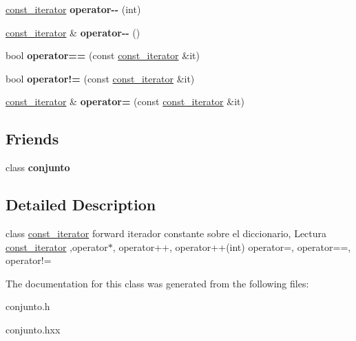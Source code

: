\begin{DoxyCompactItemize}
\item 
\hypertarget{classconjunto_1_1const__iterator_abd83ce93fe699b9f7b35be65fa9eefe6}{\hyperlink{classconjunto_1_1const__iterator}{const\-\_\-iterator} {\bfseries operator-\/-\/} (int)}\label{classconjunto_1_1const__iterator_abd83ce93fe699b9f7b35be65fa9eefe6}

\item 
\hypertarget{classconjunto_1_1const__iterator_adeba9683361264a00f4e0b8e42082d1d}{\hyperlink{classconjunto_1_1const__iterator}{const\-\_\-iterator} \& {\bfseries operator-\/-\/} ()}\label{classconjunto_1_1const__iterator_adeba9683361264a00f4e0b8e42082d1d}

\item 
\hypertarget{classconjunto_1_1const__iterator_a6d2a0501cd5eeea3db0bf9a6a553aa5f}{bool {\bfseries operator==} (const \hyperlink{classconjunto_1_1const__iterator}{const\-\_\-iterator} \&it)}\label{classconjunto_1_1const__iterator_a6d2a0501cd5eeea3db0bf9a6a553aa5f}

\item 
\hypertarget{classconjunto_1_1const__iterator_aea197d9ca07e8451eb857ae84d3796ff}{bool {\bfseries operator!=} (const \hyperlink{classconjunto_1_1const__iterator}{const\-\_\-iterator} \&it)}\label{classconjunto_1_1const__iterator_aea197d9ca07e8451eb857ae84d3796ff}

\item 
\hypertarget{classconjunto_1_1const__iterator_a035da014bfd46ca06eef82f5a8f26686}{\hyperlink{classconjunto_1_1const__iterator}{const\-\_\-iterator} \& {\bfseries operator=} (const \hyperlink{classconjunto_1_1const__iterator}{const\-\_\-iterator} \&it)}\label{classconjunto_1_1const__iterator_a035da014bfd46ca06eef82f5a8f26686}

\end{DoxyCompactItemize}
\subsection*{Friends}
\begin{DoxyCompactItemize}
\item 
\hypertarget{classconjunto_1_1const__iterator_a42fdcda39c77eabd7380e29fcdbe5dd2}{class {\bfseries conjunto}}\label{classconjunto_1_1const__iterator_a42fdcda39c77eabd7380e29fcdbe5dd2}

\end{DoxyCompactItemize}


\subsection{Detailed Description}
class \hyperlink{classconjunto_1_1const__iterator}{const\-\_\-iterator} forward iterador constante sobre el diccionario, Lectura \hyperlink{classconjunto_1_1const__iterator}{const\-\_\-iterator} ,operator$\ast$, operator++, operator++(int) operator=, operator==, operator!= 

The documentation for this class was generated from the following files\-:\begin{DoxyCompactItemize}
\item 
conjunto.\-h\item 
conjunto.\-hxx\end{DoxyCompactItemize}
